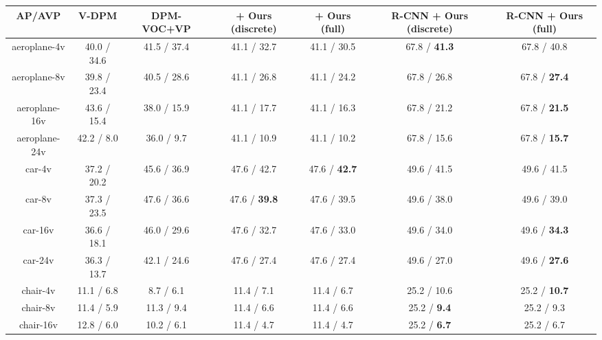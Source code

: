 %
\begin{table*}[t]
\footnotesize
  \begin{center}
    \begin{tabular}{|c||c||c||c|c||c|c|}
    \hline
    AP/AVP              & V-DPM \cite{Xiang14} & DPM-VOC+VP \cite{Pepik12}  & \cite{Pepik12} + Ours (discrete) & \cite{Pepik12} + Ours (full) & R-CNN + Ours (discrete) & R-CNN + Ours (full)\\
    \hline\hline
    aeroplane-4v        & 40.0 / 34.6         & 41.5 / 37.4             & 41.1 / 32.7       & 41.1 / 30.5        & 67.8 / \textbf{41.3}         & 67.8 / 40.8 \\ \hline
    aeroplane-8v        & 39.8 / 23.4         & 40.5 / 28.6             & 41.1 / 26.8       & 41.1 / 24.2        & 67.8 / 26.8         & 67.8 / \textbf{27.4} \\ \hline
    aeroplane-16v       & 43.6 / 15.4         & 38.0 / 15.9             & 41.1 / 17.7       & 41.1 / 16.3        & 67.8 / 21.2         & 67.8 / \textbf{21.5} \\ \hline
    aeroplane-24v       & 42.2 / 8.0          & 36.0 /  9.7             & 41.1 / 10.9       & 41.1 / 10.2        & 67.8 / 15.6         & 67.8 / \textbf{15.7} \\ \hline
    \hline
    car-4v              & 37.2 / 20.2         & 45.6 / 36.9             & 47.6 / 42.7       & 47.6 / \textbf{42.7}        & 49.6 / 41.5         & 49.6 / 41.5\\ \hline
    car-8v              & 37.3 / 23.5         & 47.6 / 36.6             & 47.6 / \textbf{39.8}       & 47.6 / 39.5        & 49.6 / 38.0         & 49.6 / 39.0\\ \hline
    car-16v             & 36.6 / 18.1         & 46.0 / 29.6             & 47.6 / 32.7       & 47.6 / 33.0        & 49.6 / 34.0         & 49.6 / \textbf{34.3}\\ \hline
    car-24v             & 36.3 / 13.7         & 42.1 / 24.6             & 47.6 / 27.4       & 47.6 / 27.4        & 49.6 / 27.0         & 49.6 / \textbf{27.6}\\ \hline
    \hline
    chair-4v            & 11.1 / 6.8          & 8.7  / 6.1              &  11.4 / 7.1       & 11.4 / 6.7         & 25.2 / 10.6         & 25.2 / \textbf{10.7} \\ \hline
    chair-8v            & 11.4 / 5.9          & 11.3 / 9.4              &  11.4 / 6.6       & 11.4 / 6.6         & 25.2 / \textbf{9.4}          & 25.2 / 9.3 \\ \hline
    chair-16v           & 12.8 / 6.0          & 10.2 / 6.1              &  11.4 / 4.7       & 11.4 / 4.7         & 25.2 / \textbf{6.7}          & 25.2 / 6.7 \\ \hline

\end{tabular}
\end{center}
\end{table*}
